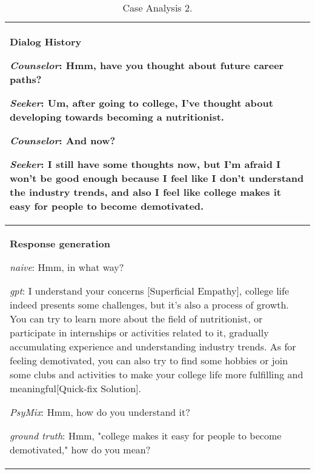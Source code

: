 \begin{table*}[htbp]
    \centering
    \begin{tabular}{|p{15.5cm}|}
    \hline
    \textbf{Dialog History} 
    \par \textit{Counselor}: Hmm, have you thought about future career paths?
    \par \textit{Seeker}: Um, after going to college, I've thought about developing towards becoming a nutritionist.
    \par \textit{Counselor}: And now?
    \par \textit{Seeker}: I still have some thoughts now, but I'm afraid I won't be good enough because I feel like I don't understand the industry trends, and also I feel like college makes it easy for people to become demotivated.
    \\
    \hline
    \textbf{Response generation} 
    \par \textit{naive}: \textcolor{green!50!black}{Hmm, in what way?}
    \par \textit{gpt}: \textcolor{orange!50!brown}{I understand your concerns [Superficial Empathy]}, \textcolor{blue!50!black}{college life indeed presents some challenges, but it's also a process of growth.} You can try to learn more about the field of nutritionist, or participate in internships or activities related to it, gradually accumulating experience and understanding industry trends. As for feeling demotivated, you can also try to find some hobbies or join some clubs and activities to make your college life more fulfilling and meaningful\textcolor{red!50!black}{[Quick-fix Solution]}.
    \par \textit{PsyMix}: \textcolor{green!50!black}{Hmm, how do you understand it?}
    \par \textit{ground truth}: \textcolor{green!50!black}{Hmm, "college makes it easy for people to become demotivated," how do you mean?}
    \\
    \hline
    \end{tabular}
    \caption{Case Analysis 2.} 
    \label{tab:case_anapysis_2}
\end{table*}



